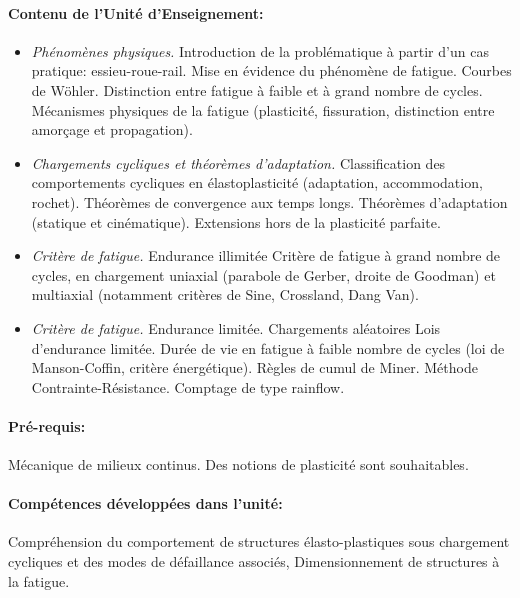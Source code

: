 \paragraph{Contenu de l’Unité d’Enseignement:}
\begin{itemize}
\item	\emph{Phénomènes physiques.}
Introduction de la problématique à partir d’un cas pratique: essieu-roue-rail. Mise en évidence du phénomène de fatigue. Courbes de Wöhler. Distinction entre fatigue à faible et à grand nombre de cycles. Mécanismes physiques de la fatigue (plasticité, fissuration, distinction entre amorçage et propagation).

\item	\emph{Chargements cycliques et théorèmes d’adaptation.}
Classification des comportements cycliques en élastoplasticité (adaptation, accommodation, rochet). Théorèmes de convergence aux temps longs. Théorèmes d’adaptation (statique et cinématique). Extensions hors de la plasticité parfaite. 

\item	\emph{Critère de fatigue.} Endurance illimitée
Critère de fatigue à grand nombre de cycles, en chargement uniaxial (parabole de Gerber, droite de Goodman) et multiaxial (notamment critères de Sine, Crossland, Dang Van). 

\item	\emph{Critère de fatigue.} Endurance limitée. Chargements aléatoires 
Lois d’endurance limitée. Durée de vie en fatigue à faible nombre de cycles (loi de Manson-Coffin, critère énergétique). Règles de cumul de Miner. Méthode Contrainte-Résistance. Comptage de type rainflow.


\end{itemize}

\paragraph{Pré-requis:} Mécanique de milieux continus. Des notions de plasticité sont souhaitables.


\paragraph{Compétences développées dans l’unité:}

Compréhension du comportement de structures élasto-plastiques sous chargement cycliques et des modes de défaillance associés, Dimensionnement de structures à la fatigue. 




